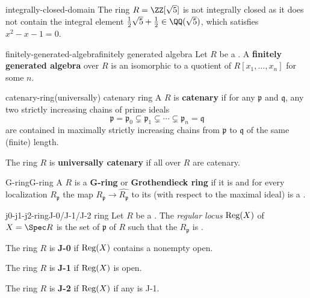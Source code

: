 \begin{example}{integrally-closed-domain}
    The ring $R = \ZZ[\sqrt{5}]$ is not integrally closed as it does not contain the integral element $\tfrac{1}{2} \sqrt{5} + \tfrac{1}{2} \in \QQ(\sqrt{5})$, which satisfies $x^2 - x - 1 = 0$.
\end{example}

\begin{topic}{finitely-generated-algebra}{finitely generated algebra}
    Let $R$ be a . A \textbf{finitely generated algebra} over $R$ is an  isomorphic to a quotient of $R[x_1, \ldots, x_n]$ for some $n$.
\end{topic}

\begin{topic}{catenary-ring}{(universally) catenary ring}
    A  $R$ is \textbf{catenary} if for any  $\mathfrak{p}$ and $\mathfrak{q}$, any two strictly increasing chains of prime ideals
    \[ \mathfrak{p} = \mathfrak{p}_0 \subsetneq \mathfrak{p}_1 \subsetneq \cdots \subsetneq \mathfrak{p}_n = \mathfrak{q} \]
    are contained in maximally strictly increasing chains from $\mathfrak{p}$ to $\mathfrak{q}$ of the same (finite) length.
    
    The ring $R$ is \textbf{universally catenary} if all  over $R$ are catenary.
\end{topic}

\begin{topic}{G-ring}{G-ring}
    A  $R$ is a \textbf{G-ring} or \textbf{Grothendieck ring} if it is  and for every localization $R_{\mathfrak{p}}$ the map $R_{\mathfrak{p}} \to \widehat{R_{\mathfrak{p}}}$ to its  (with respect to the maximal ideal) is a .
\end{topic}

\begin{topic}{j0-j1-j2-ring}{J-0/J-1/J-2 ring}
    Let $R$ be a  . The \textit{regular locus} $\textup{Reg}(X)$ of $X = \Spec R$ is the set of  $\mathfrak{p}$ of $R$ such that the  $R_\mathfrak{p}$ is .
    
    The ring $R$ is \textbf{J-0} if $\textup{Reg}(X)$ contains a nonempty open.
    
    The ring $R$ is \textbf{J-1} if $\textup{Reg}(X)$ is open.
    
    The ring $R$ is \textbf{J-2} if $\textup{Reg}(X)$ if any  is J-1.
\end{topic}

